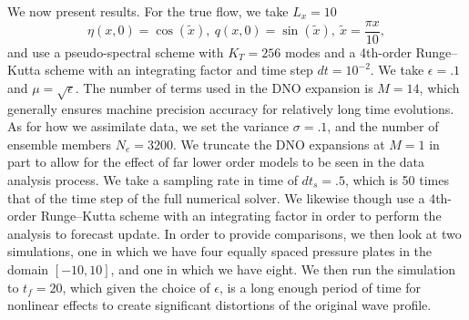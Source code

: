 We now present results.  For the true flow, we take $L_{x}=10$
\[
\eta(x,0) = \cos(\tilde{x}), ~ q(x,0) = \sin(\tilde{x}), ~ \tilde{x} = \frac{\pi x}{10},
\]
and use a pseudo-spectral scheme with $K_{T}=256$ modes and a 4th-order Runge--Kutta scheme with an integrating factor and time step $dt=10^{-2}$. We take $\epsilon=.1$ and $\mu=\sqrt{\epsilon}$.  The number of terms used in the DNO expansion is $M=14$, which generally ensures machine precision accuracy for relatively long time evolutions.  As for how we assimilate data, we set the variance $\sigma=.1$, and the number of ensemble members $N_{e}=3200$.  We truncate the DNO expansions at $M=1$ in part to allow for the effect of far lower order models to be seen in the data analysis process.  We take a sampling rate in time of $dt_{s}=.5$, which is 50 times that of the time step of the full numerical solver.  We likewise though use a 4th-order Runge--Kutta scheme with an integrating factor in order to perform the analysis to forecast update.  In order to provide comparisons, we then look at two simulations, one in which we have four equally spaced pressure plates in the domain $[-10,10]$, and one in which we have eight.  We then run the simulation to $t_{f}=20$, which given the choice of $\epsilon$, is a long enough period of time for nonlinear effects to create significant distortions of the original wave profile.  

